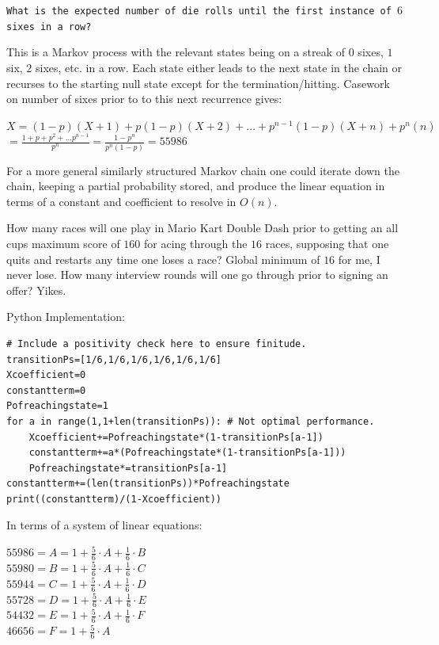 \texttt{What is the expected number of die rolls until the first instance of $6$ sixes in a row?}

This is a Markov process with the relevant states being on a streak of $0$ sixes, $1$ six, $2$ sixes, etc. in a row. Each state either leads to the next state in the chain or recurses to the starting null state except for the termination/hitting. Casework on number of sixes prior to to this next recurrence gives:

$X = (1-p)(X+1)+p(1-p)(X+2)+\dots+p^{n-1}(1-p)(X+n)+p^n(n)$ \\
$= \frac{1+p+p^2+\dots p^{n-1}}{p^n} = \frac{1-p^n}{p^n (1-p)} = \boxed{55986}$

For a more general similarly structured Markov chain one could iterate down the chain, keeping a partial probability stored, and produce the linear equation in terms of a constant and coefficient to resolve in $O(n)$.

How many races will one play in Mario Kart Double Dash prior to getting an all cups maximum score of $160$ for acing through the $16$ races, supposing that one quits and restarts any time one loses a race? Global minimum of $16$ for me, I never lose. How many interview rounds will one go through prior to signing an offer? Yikes.

Python Implementation:

\begin{verbatim}
# Include a positivity check here to ensure finitude.
transitionPs=[1/6,1/6,1/6,1/6,1/6,1/6]
Xcoefficient=0
constantterm=0
Pofreachingstate=1
for a in range(1,1+len(transitionPs)): # Not optimal performance.
    Xcoefficient+=Pofreachingstate*(1-transitionPs[a-1])
    constantterm+=a*(Pofreachingstate*(1-transitionPs[a-1]))
    Pofreachingstate*=transitionPs[a-1]
constantterm+=(len(transitionPs))*Pofreachingstate
print((constantterm)/(1-Xcoefficient))
\end{verbatim}

In terms of a system of linear equations:

$55986 = A = 1+\frac{5}{6} \cdot A+\frac{1}{6} \cdot B$ \\
$55980 = B = 1+\frac{5}{6} \cdot A+\frac{1}{6} \cdot C$ \\
$55944 = C = 1+\frac{5}{6} \cdot A+\frac{1}{6} \cdot D$ \\
$55728 = D = 1+\frac{5}{6} \cdot A+\frac{1}{6} \cdot E$ \\
$54432 = E = 1+\frac{5}{6} \cdot A+\frac{1}{6} \cdot F$ \\
$46656 = F = 1+\frac{5}{6} \cdot A$

